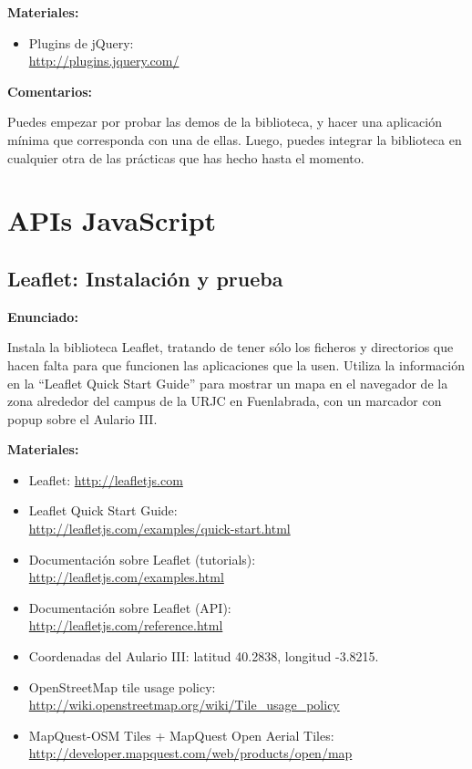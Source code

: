 \textbf{Materiales:}

\begin{itemize}
\item Plugins de jQuery: \\
  \url{http://plugins.jquery.com/}
\end{itemize}

\textbf{Comentarios:}

Puedes empezar por probar las demos de la biblioteca, y hacer una aplicación mínima que corresponda con una de ellas. Luego, puedes integrar la biblioteca en cualquier otra de las prácticas que has hecho hasta el momento.

\section{APIs JavaScript}

\subsection{Leaflet: Instalación y prueba}
\label{subsec:apis-leaflet-instal}

\textbf{Enunciado:}

Instala la biblioteca Leaflet, tratando de tener sólo los ficheros y directorios que hacen falta para que funcionen las aplicaciones que la usen. Utiliza la información en la ``Leaflet Quick Start Guide'' para mostrar un mapa en el navegador de la zona alrededor del campus de la URJC en Fuenlabrada, con un marcador con popup sobre el Aulario III.

\textbf{Materiales:}

\begin{itemize}
\item Leaflet: \url{http://leafletjs.com}
\item Leaflet Quick Start Guide: \\
  \url{http://leafletjs.com/examples/quick-start.html}
\item Documentación sobre Leaflet (tutorials): \\
  \url{http://leafletjs.com/examples.html}
\item Documentación sobre Leaflet (API): \\
  \url{http://leafletjs.com/reference.html}
\item Coordenadas del Aulario III: latitud 40.2838, longitud -3.8215.
\item OpenStreetMap tile usage policy: \\
  \url{http://wiki.openstreetmap.org/wiki/Tile_usage_policy}
\item MapQuest-OSM Tiles + MapQuest Open Aerial Tiles: \\
  \url{http://developer.mapquest.com/web/products/open/map}
\end{itemize}

